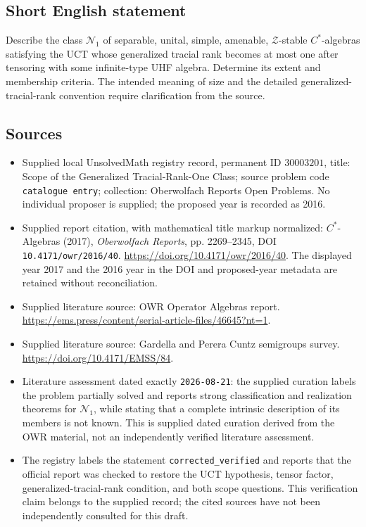 \documentclass[11pt]{article}
\begin{document}
\subsection{Short English statement}
Describe the class \(\mathcal N_1\) of separable, unital, simple, amenable, \(\mathcal Z\)-stable \(C^*\)-algebras satisfying the UCT whose generalized tracial rank becomes at most one after tensoring with some infinite-type UHF algebra. Determine its extent and membership criteria. The intended meaning of size and the detailed generalized-tracial-rank convention require clarification from the source.
\subsection{Sources}
\begin{itemize}
\item Supplied local UnsolvedMath registry record, permanent ID \(30003201\), title: Scope of the Generalized Tracial-Rank-One Class; source problem code \texttt{catalogue entry}; collection: Oberwolfach Reports Open Problems. No individual proposer is supplied; the proposed year is recorded as 2016.
\item Supplied report citation, with mathematical title markup normalized: \(C^*\)-Algebras (2017), \emph{Oberwolfach Reports}, pp. 2269--2345, DOI \texttt{10.4171/owr/2016/40}. \url{https://doi.org/10.4171/owr/2016/40}. The displayed year 2017 and the 2016 year in the DOI and proposed-year metadata are retained without reconciliation.
\item Supplied literature source: OWR Operator Algebras report. \url{https://ems.press/content/serial-article-files/46645?nt=1}.
\item Supplied literature source: Gardella and Perera Cuntz semigroups survey. \url{https://doi.org/10.4171/EMSS/84}.
\item Literature assessment dated exactly \texttt{2026-08-21}: the supplied curation labels the problem partially solved and reports strong classification and realization theorems for \(\mathcal N_1\), while stating that a complete intrinsic description of its members is not known. This is supplied dated curation derived from the OWR material, not an independently verified literature assessment.
\item The registry labels the statement \texttt{corrected\_verified} and reports that the official report was checked to restore the UCT hypothesis, tensor factor, generalized-tracial-rank condition, and both scope questions. This verification claim belongs to the supplied record; the cited sources have not been independently consulted for this draft.
\end{itemize}
\end{document}
